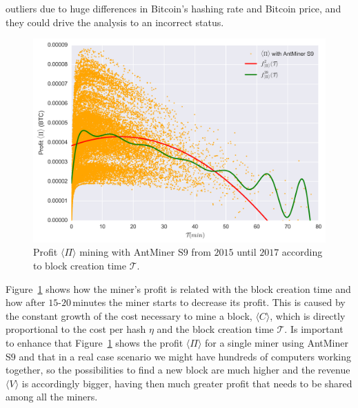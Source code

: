 \documentclass[USenglish]{uit-thesis}
\begin{document}
outliers due to huge differences in Bitcoin's hashing
rate and Bitcoin price, and they could drive the
analysis to an incorrect status.
\begin{figure}[h]
	\centering
	\includegraphics[width=1\textwidth]{img/profit_creation_time}
	\caption{Profit $\langle \Pi \rangle$ mining with AntMiner S$9$ from
		$2015$ until $2017$ according to block creation time $\mathcal{T}$.}
	\label{fig:profit_creation_time}
\end{figure}
Figure~\ref{fig:profit_creation_time} shows how the
miner's profit is related with the block creation time and how
after $15$-$20$\,minutes the miner starts to decrease its profit.
This is caused by the constant growth of the cost
necessary to mine a block, $\langle C \rangle$,
which is directly proportional to the cost per hash $\eta$ and
the block creation time $\mathcal{T}$.
Is important to enhance that Figure~\ref{fig:profit_creation_time} shows
the profit $\langle \Pi \rangle$ for a single miner
using AntMiner S$9$ and that in a real
case scenario we might have hundreds of
computers working together, so the possibilities
to find a new block are much higher and
the revenue $\langle V \rangle$ is
accordingly bigger, having then
much greater profit that needs to be shared
among all the miners.
\end{document}
